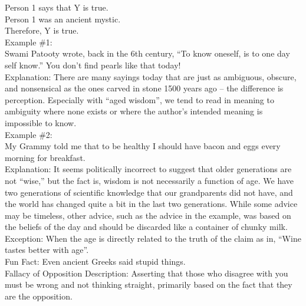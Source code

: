 \documentclass[a4paper,12pt,single,pdftex]{scrartcl}
\begin{document}
    
      Person 1 says that Y is true. 
    \\

    
      Person 1 was an ancient mystic.
    \\

    
      Therefore, Y is true.
    \\

    
      Example \#1:
    \\

    
      Swami Patooty wrote, back in the 6th century, “To know oneself, is to one day self know.”  You don’t find pearls like that today!
    \\

    
      Explanation: There are many sayings today that are just as ambiguous, obscure, and nonsensical as the ones carved in stone 1500 years ago -- the difference is perception.  Especially with “aged wisdom”, we tend to read in meaning to ambiguity where none exists or where the author’s intended meaning is impossible to know.
    \\

    
      Example \#2:
    \\

    
      My Grammy told me that to be healthy I should have bacon and eggs every morning for breakfast.
    \\

    
      Explanation: It seems politically incorrect to suggest that older generations are not “wise,” but the fact is, wisdom is not necessarily a function of age.  We have two generations of scientific knowledge that our grandparents did not have, and the world has changed quite a bit in the last two generations.  While some advice may be timeless, other advice, such as the advice in the example, was based on the beliefs of the day and should be discarded like a container of chunky milk.
    \\

    
      Exception: When the age is directly related to the truth of the claim as in, “Wine tastes better with age”.
    \\

    
      Fun Fact: Even ancient Greeks said stupid things.
    \\

  

Fallacy of Opposition
    Description: Asserting that those who disagree with you must be wrong and not thinking straight, primarily based on the fact that they are the opposition.
\end{document}

